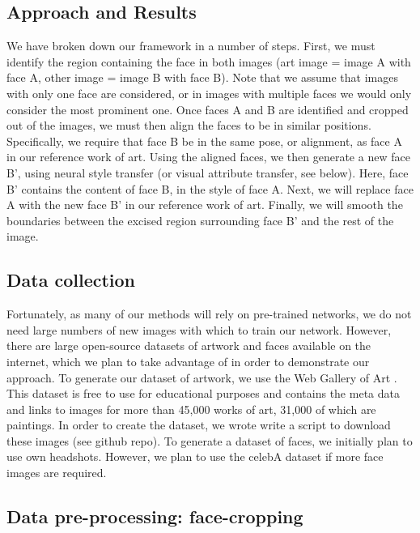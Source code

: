 \documentclass{pnastwo2}
\begin{document}
\begin{article}
\section{Approach and Results}

We have broken down our framework in a number of steps. First, we must identify the region containing the face in both images (art image = image A with face A, other image = image B with face B). Note that we assume that images with only one face are considered, or in images with multiple faces we would only consider the most prominent one. Once faces A and B are identified and cropped out of the images, we must then align the faces to be in similar positions. Specifically, we require that face B be in the same pose, or alignment, as face A in our reference work of art. Using the aligned faces, we then generate a new face B', using neural style transfer (or visual attribute transfer, see below). Here, face B' contains the content of face B, in the style of face A. Next, we will replace face A with the new face B' in our reference work of art. Finally, we will smooth the boundaries between the excised region surrounding face B' and the rest of the image.

\subsection{Data collection}

Fortunately, as many of our methods will rely on pre-trained networks, we do not need large numbers of new images with which to train our network. However, there are large open-source datasets of artwork and faces available on the internet, which we plan to take advantage of in order to demonstrate our approach. To generate our dataset of artwork, we use the Web Gallery of Art \cite{WebGallery}. This dataset is free to use for educational purposes and contains the meta data and links to images for more than 45,000 works of art, 31,000 of which are paintings. In order to create the dataset, we wrote write a script to download these images (see github repo).  To generate a dataset of faces, we initially plan to use own headshots. However, we plan to use the celebA dataset \cite{liu2018large} if more face images are required.

\subsection{Data pre-processing: face-cropping}


\end{article}
\end{document}

